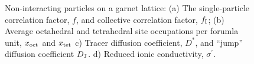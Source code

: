 \documentclass[aps,prb,twocolumn,superscriptaddress,reprint]{revtex4-1}
\begin{document}
\begin{figure}[tb]
  \centering
    \caption{\label{fig:non-interacting_data}Non-interacting particles on a garnet lattice: (a) The single-particle correlation factor, $f$, and collective correlation factor, $f_{\mathrm{I}}$; (b) Average octahedral and tetrahedral site occupations per forumla unit, $x_{\mathrm{oct}}$ and $x_{\mathrm{tet}}$ c) Tracer diffusion coefficient, $D^*$, and ``jump'' diffusion coefficient $D_{\mathrm{J}}$. d) Reduced ionic conductivity, $\sigma^\prime$.}
\end{figure}
\end{document}
